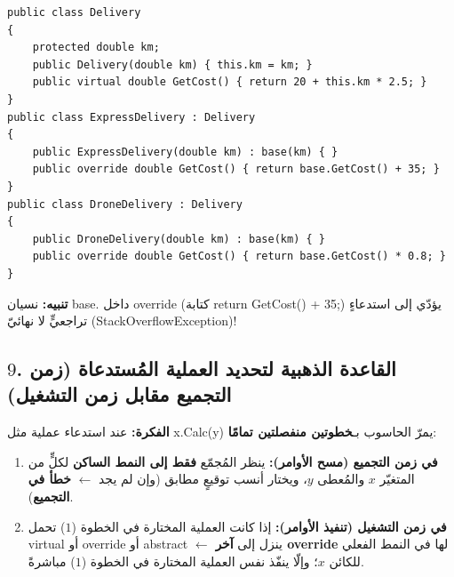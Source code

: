 \documentclass[14pt]{extarticle}
\begin{document}
\begin{boxCode}
\begin{english}
\begin{verbatim}
public class Delivery
{
    protected double km;
    public Delivery(double km) { this.km = km; }
    public virtual double GetCost() { return 20 + this.km * 2.5; }
}
public class ExpressDelivery : Delivery
{
    public ExpressDelivery(double km) : base(km) { }
    public override double GetCost() { return base.GetCost() + 35; }
}
public class DroneDelivery : Delivery
{
    public DroneDelivery(double km) : base(km) { }
    public override double GetCost() { return base.GetCost() * 0.8; }
}
\end{verbatim}
\end{english}
\end{boxCode}

\textbf{تنبيه:} نسيان \textenglish{base.} داخل \textenglish{override} (كتابة \textenglish{return GetCost() + 35;}) يؤدّي إلى استدعاءٍ تراجعيٍّ لا نهائيّ (\textenglish{StackOverflowException})!

\filbreak
\subsection*{$9$. القاعدة الذهبية لتحديد العملية المُستدعاة (زمن التجميع مقابل زمن التشغيل)}
\textbf{الفكرة:} عند استدعاء عملية مثل \textenglish{x.Calc(y)} يمرّ الحاسوب بـ\textbf{خطوتين منفصلتين تمامًا}:
\begin{enumerate}[itemsep=0.35em]
    \item \textbf{في زمن التجميع (مسح الأوامر):} ينظر المُجمّع \textbf{فقط إلى النمط الساكن} لكلٍّ من المتغيّر $x$ والمُعطى $y$، ويختار أنسب توقيعٍ مطابق (وإن لم يجد $\leftarrow$ \textbf{خطأ في التجميع}).
    \item \textbf{في زمن التشغيل (تنفيذ الأوامر):} إذا كانت العملية المختارة في الخطوة ($1$) تحمل \textenglish{virtual} أو \textenglish{override} أو \textenglish{abstract} $\leftarrow$ ينزل إلى \textbf{آخر \textenglish{override}} لها في النمط الفعلي للكائن $x$؛ وإلّا ينفّذ نفس العملية المختارة في الخطوة ($1$) مباشرةً.
\end{enumerate}
\end{document}
